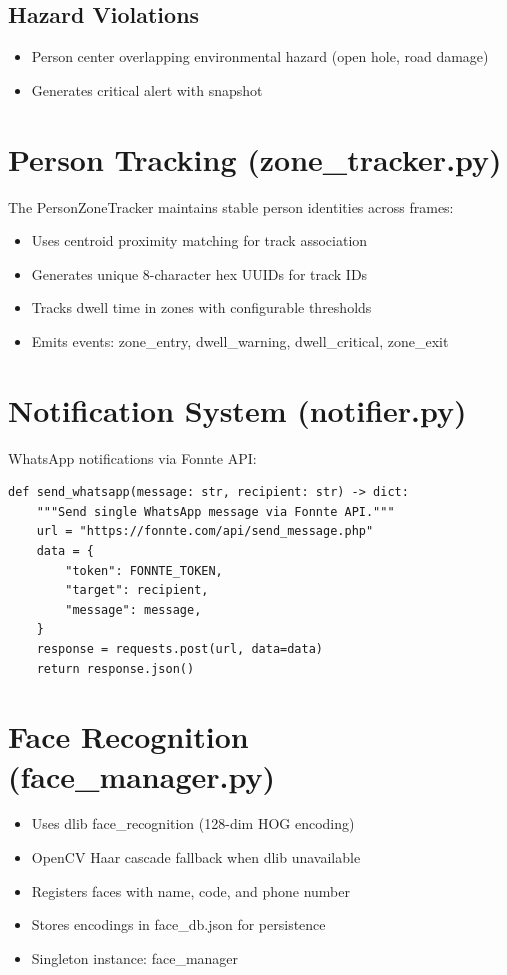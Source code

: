 \documentclass[12pt,a4paper,oneside]{book}
\begin{document}
\subsection{Hazard Violations}
\begin{itemize}
    \item Person center overlapping environmental hazard (open hole, road damage)
    \item Generates critical alert with snapshot
\end{itemize}

\section{Person Tracking (zone\_tracker.py)}

The PersonZoneTracker maintains stable person identities across frames:

\begin{itemize}
    \item Uses centroid proximity matching for track association
    \item Generates unique 8-character hex UUIDs for track IDs
    \item Tracks dwell time in zones with configurable thresholds
    \item Emits events: zone\_entry, dwell\_warning, dwell\_critical, zone\_exit
\end{itemize}

\section{Notification System (notifier.py)}

WhatsApp notifications via Fonnte API:

\begin{lstlisting}[style=pythonstyle]
def send_whatsapp(message: str, recipient: str) -> dict:
    """Send single WhatsApp message via Fonnte API."""
    url = "https://fonnte.com/api/send_message.php"
    data = {
        "token": FONNTE_TOKEN,
        "target": recipient,
        "message": message,
    }
    response = requests.post(url, data=data)
    return response.json()
\end{lstlisting}

\section{Face Recognition (face\_manager.py)}

\begin{itemize}
    \item Uses dlib face\_recognition (128-dim HOG encoding)
    \item OpenCV Haar cascade fallback when dlib unavailable
    \item Registers faces with name, code, and phone number
    \item Stores encodings in face\_db.json for persistence
    \item Singleton instance: face\_manager
\end{itemize}
\end{document}

